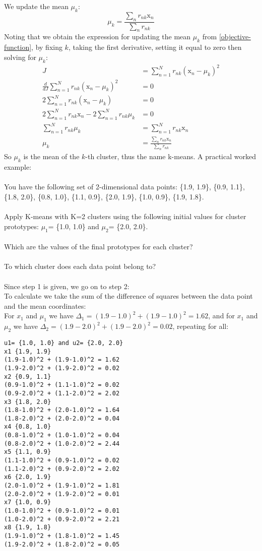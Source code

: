 We update the mean $\mu_k$:
$$
\mu_k = \frac{\sum_n r_{nk}\mathrm{x}_n}{\sum_n r_{nk}}
$$
Noting that we obtain the expression for updating the mean $\mu_k$ from \ref{objective-function}, by fixing $k$, taking the first derivative, setting it equal to zero then solving for $\mu_k$:
\begin{align*}
    J & = \sum_{n=1}^N r_{nk} (\mathrm{x}_n-\mu_k)^2 \\
    \frac{d}{dJ}\sum_{n=1}^N r_{nk} (\mathrm{x}_n-\mu_k)^2 & = 0 \\
    2 \sum_{n=1}^N r_{nk} (\mathrm{x}_n-\mu_k) & = 0 \\
    2\sum_{n=1}^N r_{nk}\mathrm{x}_n - 2\sum_{n=1}^N r_{nk}\mu_k & = 0 \\
    \sum_{n=1}^N r_{nk}\mu_k & = \sum_{n=1}^N r_{nk}\mathrm{x}_n \\
    \mu_k & = \frac{\sum_n r_{nk}\mathrm{x}_n}{\sum_n r_{nk}}    
\end{align*}
So $\mu_k$ is the mean of the $k$-th cluster, thus the name k-means. A practical worked example: \\
\\
You have the following set of 2-dimensional data points: \{1.9, 1.9\}, \{0.9, 1.1\}, \{1.8, 2.0\}, \{0.8, 1.0\}, \{1.1, 0.9\}, \{2.0, 1.9\}, \{1.0, 0.9\}, \{1.9, 1.8\}. \\
\\
Apply K-means with K=2 clusters using the following initial values for cluster prototypes: $\mu_1$= \{1.0, 1.0\} and $\mu_2$= \{2.0, 2.0\}. \\
\\
Which are the values of the final prototypes for each cluster? \\
\\
To which cluster does each data point belong to? \\
\\
Since step 1 is given, we go on to step 2: \\
To calculate we take the sum of the difference of squares between the data point and the mean coordinates: \\
For $x_1$ and $\mu_1$ we have $\Delta_1 = (1.9-1.0)^2+(1.9-1.0)^2 = 1.62$, and for $x_1$ and $\mu_2$ we have $\Delta_2 = (1.9-2.0)^2+(1.9-2.0)^2 = 0.02$, repeating for all:
\begin{verbatim}
u1= {1.0, 1.0} and u2= {2.0, 2.0}
x1 {1.9, 1.9}
(1.9-1.0)^2 + (1.9-1.0)^2 = 1.62
(1.9-2.0)^2 + (1.9-2.0)^2 = 0.02
x2 {0.9, 1.1}
(0.9-1.0)^2 + (1.1-1.0)^2 = 0.02
(0.9-2.0)^2 + (1.1-2.0)^2 = 2.02
x3 {1.8, 2.0}
(1.8-1.0)^2 + (2.0-1.0)^2 = 1.64
(1.8-2.0)^2 + (2.0-2.0)^2 = 0.04
x4 {0.8, 1.0}
(0.8-1.0)^2 + (1.0-1.0)^2 = 0.04
(0.8-2.0)^2 + (1.0-2.0)^2 = 2.44
x5 {1.1, 0.9}
(1.1-1.0)^2 + (0.9-1.0)^2 = 0.02
(1.1-2.0)^2 + (0.9-2.0)^2 = 2.02
x6 {2.0, 1.9}
(2.0-1.0)^2 + (1.9-1.0)^2 = 1.81
(2.0-2.0)^2 + (1.9-2.0)^2 = 0.01
x7 {1.0, 0.9}
(1.0-1.0)^2 + (0.9-1.0)^2 = 0.01
(1.0-2.0)^2 + (0.9-2.0)^2 = 2.21
x8 {1.9, 1.8}
(1.9-1.0)^2 + (1.8-1.0)^2 = 1.45
(1.9-2.0)^2 + (1.8-2.0)^2 = 0.05    
\end{verbatim}
